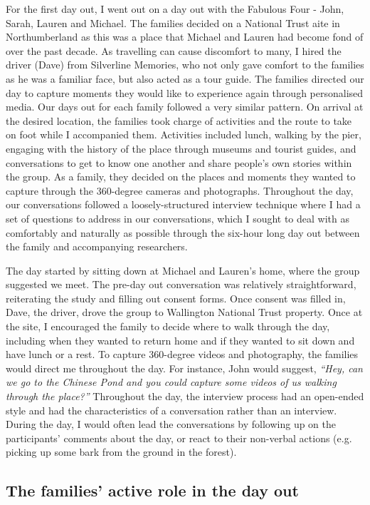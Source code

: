 For the first day out, I went out on a day out with the Fabulous Four - John, Sarah, Lauren and Michael. The families decided on a National Trust aite in Northumberland as this was a place that Michael and Lauren had become fond of over the past decade. As travelling can cause discomfort to many, I hired the driver (Dave) from Silverline Memories, who not only gave comfort to the families as he was a familiar face, but also acted as a tour guide. The families directed our day to capture moments they would like to experience again through personalised media. Our days out for each family followed a very similar pattern. On arrival at the desired location, the families took charge of activities and the route to take on foot while I accompanied them. Activities included lunch, walking by the pier, engaging with the history of the place through museums and tourist guides, and conversations to get to know one another and share people's own stories within the group. As a family, they decided on the places and moments they wanted to capture through the 360-degree cameras and photographs. Throughout the day, our conversations followed a loosely-structured interview technique where I had a set of questions to address in our conversations, which I sought to deal with as comfortably and naturally as possible through the six-hour long day out between the family and accompanying researchers.

The day started by sitting down at Michael and Lauren's home, where the group suggested we meet. The pre-day out conversation was relatively straightforward, reiterating the study and filling out consent forms. Once consent was filled in, Dave, the driver, drove the group to Wallington National Trust property. Once at the site, I encouraged the family to decide where to walk through the day, including when they wanted to return home and if they wanted to sit down and have lunch or a rest. To capture 360-degree videos and photography, the families would direct me throughout the day. For instance, John would suggest, \textit{``Hey, can we go to the Chinese Pond and you could capture some videos of us walking through the place?''} Throughout the day, the interview process had an open-ended style and had the characteristics of a conversation rather than an interview. During the day, I would often lead the conversations by following up on the participants' comments about the day, or react to their non-verbal actions (e.g. picking up some bark from the ground in the forest).

\subsection{The families' active role in the day out}
\label{ActiveRole}

